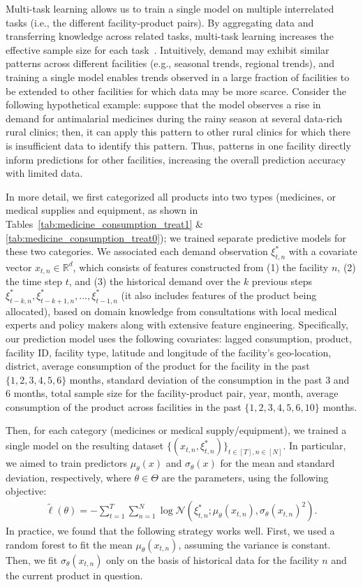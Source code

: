 \documentclass[12pt]{article}
\begin{document}
Multi-task learning allows us to train a single model on multiple interrelated tasks (i.e., the different facility-product pairs). By aggregating data and transferring knowledge across related tasks, multi-task learning increases the effective sample size for each task~\cite{caruana1997multitask}. Intuitively, demand may exhibit similar patterns across different facilities (e.g., seasonal trends, regional trends), and training a single model enables trends observed in a large fraction of facilities to be extended to other facilities for which data may be more scarce. Consider the following hypothetical example: suppose that the model observes a rise in demand for antimalarial medicines during the rainy season at several data-rich rural clinics; then, it can apply this pattern to other rural clinics for which there is insufficient data to identify this pattern. Thus, patterns in one facility directly inform predictions for other facilities, increasing the overall prediction accuracy with limited data.

In more detail, we first categorized all products into two types (medicines, or medical supplies and equipment, as shown in Tables~\ref{tab:medicine_consumption_treat1} \& \ref{tab:medicine_consumption_treat0}); we trained separate predictive models for these two categories. We associated each demand observation $\xi_{t,n}^*$ with a covariate vector $x_{t,n}\in\mathbb{R}^d$, which consists of features constructed from (1) the facility $n$, (2) the time step $t$, and (3) the historical demand over the $k$ previous steps $\xi_{t-k,n}^*,\xi_{t-k+1,n}^*,...,\xi_{t-1,n}^*$ (it also includes features of the product being allocated), based on domain knowledge from consultations with local medical experts and policy makers along with extensive feature engineering. Specifically, our prediction model uses the following covariates: lagged consumption, product, facility ID, facility type, latitude and longitude of the facility's geo-location, district, average consumption of the product for the facility in the past $\{1,2,3,4,5,6\}$ months, standard deviation of the consumption in the past 3 and 6 months, total sample size for the facility-product pair, year, month, average consumption of the product across facilities in the past $\{1,2,3,4,5,6,10\}$ months.

Then, for each category (medicines or medical supply/equipment), we trained a single model on the resulting dataset $\{(x_{t,n},\xi_{t,n}^*)\}_{t\in[T],n\in[N]}$. In particular, we aimed to train predictors $\mu_{\theta}(x)$ and $\sigma_{\theta}(x)$ for the mean and standard deviation, respectively, where $\theta\in\Theta$ are the parameters, using the following objective:
\begin{align}
\label{eqn:nll}
\tilde{\ell}(\theta)=-\sum_{t=1}^T\sum_{n=1}^N\log\mathcal{N}(\xi_{t,n}^*;\mu_\theta(x_{t,n}),\sigma_\theta(x_{t,n})^2).
\end{align}
In practice, we found that the following strategy works well. First, we used a random forest to fit the mean $\mu_{\theta}(x_{t,n})$, assuming the variance is constant. Then, we fit $\sigma_{\theta}(x_{t,n})$ only on the basis of historical data for the facility $n$ and the current product in question.
\end{document}
